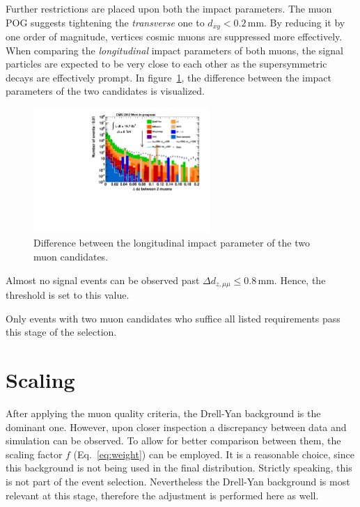 Further restrictions are placed upon both the impact parameters. The muon POG suggests tightening the \textit{transverse} one to $d_{xy} < 0.2\,\text{mm}$. By reducing it by one order of magnitude, vertices  cosmic muons are suppressed more effectively. When comparing the \textit{longitudinal} impact parameters of both muons, the signal particles are expected to be very close to each other as the supersymmetric decays are effectively prompt. In figure~\ref{fig:deltadz}, the difference between the impact parameters of the two candidates is visualized.

\begin{figure}[ht!]
  \centering
    \includegraphics[width=0.6\textwidth]{plots/dz_mumu.pdf}
  \caption{Difference between the longitudinal impact parameter of the two muon candidates.}
  \label{fig:deltadz}
\end{figure}

\noindent Almost no signal events can be observed past $\Delta d_{z, \mu\mu} \leq 0.8\,\text{mm}$. Hence, the threshold is set to this value.

Only events with two muon candidates who suffice all listed requirements pass this stage of the selection.



\section{Scaling}
\label{sec:scaling}

After applying the muon quality criteria, the Drell-Yan background is the dominant one. However, upon closer inspection a discrepancy between data and simulation can be observed. To allow for better comparison between them, the scaling factor $f$ (Eq.~\eqref{eq:weight}) can be employed. It is a reasonable choice, since this background is not being used in the final distribution. Strictly speaking, this is not part of the event selection. Nevertheless the Drell-Yan background is most relevant at this stage, therefore the adjustment is performed here as well.

